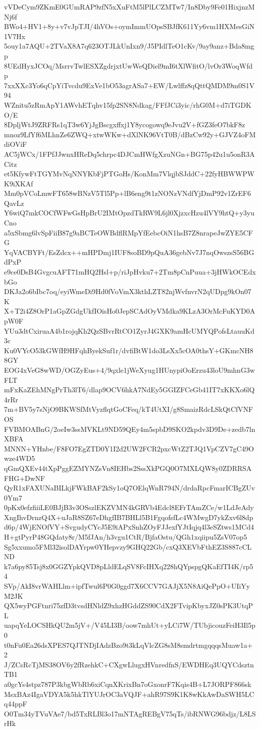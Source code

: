 vVDeCym9ZKmE0GUmRAP9zfN5xXuFtM5lPlLCZMTw7/In8Dby9Fe01HixjnzMNj6f
BWo4+HV1+8y+v7vJpTJI/4hVOs+oymImmUOpsSBJfK611Yy6vm1HXMesGiN1V7Hx
5ouy1a7AQU+2TVaX8A7q623OTJLkUnIxn9/J5PIdlTeO1cKv/9ay9anz+Bda8mgp
8UEdHyxJCOq/MsrrvTwlESXZgdrjxtUwWeQDiel9mI6tXlWfitO/lvOr3WoqWfdp
7xxXXc3Yo6qCpYiTvcdu9ExVe1bO53agrASa7+EW/Lwlffz8qQttQMDM9m0S1V94
WZnitu5zRmApY1AWvhETqhv15fp2SN8Ndkag/FFfJCi3yic/rhG0M+d7iTGDKO/E
8DpljWtJ9ZRFRs1qT3w6YjJgBscgxffxj1Y8ycogowq9eJvu2V+fGZ3feO7bkF8z
mnoz9LfYf6MLhnZe6ZWQ+xtwWKw+dXlNK96VtT0B/dBzCw92y+GJVZ4oFMdiOViF
AC5jWCx/1FPfJJwnxHReDq5chrpc4DJCmHWfgXzuNGn+BG75p42u1u5onR3ACitz
et5KfywFtTGYMvNqNNYKbFjPTGoHs/KonMm7VlqjbSJddC+22fyHBWWPWK9iXKAf
Mm0pVCoLmwFT658wBNzV5Tl5Pp+lB6eng9t1zNONzVNdfYjDmP92v1ZrEF6QavLz
Y6wiQ7mkCOCfWFwGsHpBrU2IMtOpzdTkRW9L6jl0XjzxcHzu4lVY9htQ+y3yuCno
a5xSbmg6lvSpFiiB87g9aBCTeOWBdflRMpYfEebcOiN1hsB7Z8nrapeJwZYE5CFG
YqVACBYFt/EsZdcx++mHPDmj1IUF8soBD9pQuA36gebNv7J7nqOwszsS56BGdPxP
e9ce0DsB4GvgcuAFT71mHQ2Hsl+p/riJpHvku7+2Tm8pCnPuua+3jHWkOCEdxbGo
DKJa2o6bIbc7oq/eyiWmeDi9Hd0fVoVmX3kthLZT82njWvfnvrN2qUDpg9kOn07K
X+T2i4Z8OrP1aGpZGdgUkfIOisHo0JepSCAdOyVMdka9KLzA3OrMcFuKYD0ApW0F
YUu3dtCxiruaA4b1rojqKh2QzSBvrRtCO1ZyrJ4GXK9amHcUMYQPofsLtauuKd3c
Ku0VYcO53kGWfH9HFqhByekSuf1r/dvfiBtW1do3LsXx5cOA0thsY+GKmcNH88GY
EOG4xVeG8wWD/OGZyEus+4/9qxle1jWeXyug1HUnypiOoErzu43loU9mhnG3wFLT
mFxKaZEhMNgPrTh3lT6/dlap9OCV6hkA7NdEy5GGIZFCeGb41IT7xKKXo6lQ4rRr
7m+BV5y7sNjO9BKWSfMtVyzflqtGoCFeq/kT4UtXI/g8SmaizRdcLSkQtCfVNFOS
FVBMOABnG/2oeIw3ssMVKLt9ND59QEy4m5spbD9SKO2kpdv3D9De+zedb7lnXBFA
MNNN+YHnbe/F8FO7EgZTD0Y1I2d2UW2FCR2pxcWtZ2TJQ1VpCZV7gC49Owze4WD5
qGmQXEv44tXpPggEZMYNZsVn8IEHbs2SssXkPGQ0O7MXLQW8y0ZDRRSAFHG+DwNF
QyR1xFAXUNaBILkjFWkBAF2kSy1oQ7OElqWnR794N/drdaRpcFmarICBgZUv0Ym7
0pKx0efzfiiiLE0BJjB3v3OSszlEKZVMN4kGRVb4Edcl8EFrTAmZCe/w1LdJeAdy
XngIhvDrnzQ4X+uJaR8SZ67eDhgfIB7BHLl5B1FgqofsfLc4WMwgD7ykZxv6l8dp
d6p/4WjENOfVY+SvgudyCYcJ5E9iAPxSnhZOyFJJexfYJtIqjq4l3eSZtws1MCd4
H+gtPyrP48GQdaty8r/M5fJAn/h3vgu1CtR/BjfaOstu/QGh1xqiipu5ZsV07op5
Sg5xxumo5FMl32isolDAYrpw0YHepvzy9GHQ22Gb/cxQ3XEVbFthEZ3S887cCLND
k7a6py85Tsj8x0GGZYpkQVD8pLldELqSV8FcIHXq228hQYpspgQKaEfTI4K/rp54
SVp/AkI8vrWAHLlm+ipfTwul6P0G0ggd7X6CCV7GAJjX5N8AiQePpO+UIiYyM2JK
QX5wyPGFtnri75zfD3tvsdHNldZ9xhzHGddZS90CdX2FTvipKbyxJZ0sPK3UtqPL
uapqYeLOCSHkQU2m5jV+/V45LI3B/oow7mhUt+yLCi7W/TUbjicouzFeiH3Il5p0
t0nFu0Ea26dsXPES7QJTNDjIAdzBzo9t3kLqVlcZG8sM8smdrtmgqqqsMuaw1a+2
J/ZCsRcTjMS38OV6y2fRzehkC+CXgwLlugxHVnredfnS/EWDHEq3UQYCdsztnTB1
a0gcYs4stpz787P3kbgWbRb6xiCqnXKrixBn7oGxonrF7Kqis4B+L7JORPF866sk
MsxBAz4IgaVDYA5k5hkTlYUJrOC3aVQJF+ahR97S9K1K8wKkAwDaSWH5LCq44ppF
O0Tm34yTVuVAe7/bd5TxRLBl3o17mNTAgREBgV75qTs/ibRNWG96bdjz/L8LSrHk
